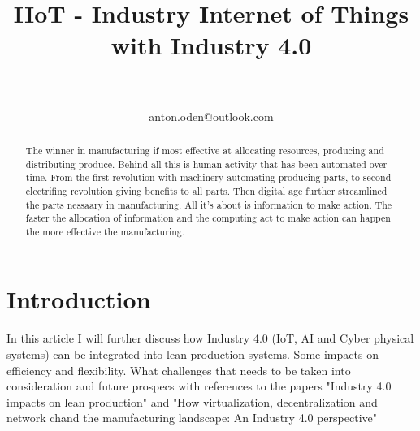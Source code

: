 \documentclass[article,a4paper]{IEEEtran}
\title{IIoT - Industry Internet of Things with Industry 4.0}
\author{
\IEEEauthorblockN{Anton Odén}\\
\IEEEauthorblockA{Dept. of Maths and Computer Science\\Karlstad University\\
651 88 KARLSTAD, Sweden}\\
anton.oden@outlook.com
}
\begin{document}
\maketitle
    \begin{abstract}
    The winner in manufacturing if most effective at allocating resources, producing and distributing produce. Behind all this is human activity that has been automated over time. From the first revolution with machinery automating producing parts, to second electrifing revolution giving benefits to all parts. Then digital age further streamlined the parts nessaary in manufacturing. All it's about is information to make action. The faster the allocation of information and the computing act to make action can happen the more effective the manufacturing.
    \end{abstract}
    
    \section{Introduction}
    In this article I will further discuss how Industry 4.0 (IoT, AI and Cyber physical systems) can be integrated into lean production systems. Some impacts on efficiency and flexibility. What challenges that needs to be taken into consideration and future prospecs with references to the papers "Industry 4.0 impacts on lean production" \cite{Impact_Lean_Prod} and "How virtualization, decentralization and network chand the manufacturing landscape: An Industry 4.0 perspective" \cite{Change_Man_Landscape}
\end{document}
